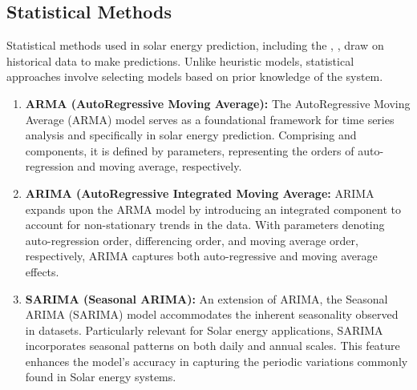 \documentclass[12pt]{uomthesis}
\begin{document}
\subsection{Statistical Methods}
Statistical methods used in solar energy prediction, including the , ,  draw on historical data to make predictions. Unlike heuristic models, statistical approaches involve selecting models based on prior knowledge of the system.

\begin{enumerate}
    \item \textbf{ARMA (AutoRegressive Moving Average):} The AutoRegressive Moving Average (ARMA) model \cite{singh2019guide,colak2015multi} serves as a foundational framework for time series analysis and specifically in solar energy prediction. Comprising  and  components, it is defined by parameters, representing the orders of auto-regression and moving average, respectively.
    \item \textbf{ARIMA (AutoRegressive Integrated Moving Average:} ARIMA \cite{atique2019forecasting,colak2015multi} expands upon the ARMA model by introducing an integrated component to account for non-stationary trends in the data. With parameters denoting auto-regression order, differencing order, and moving average order, respectively, ARIMA captures both auto-regressive and moving average effects.
    \item \textbf{SARIMA (Seasonal ARIMA):} An extension of ARIMA, the Seasonal ARIMA (SARIMA) \cite{haddad2019wind} model accommodates the inherent seasonality observed in datasets. Particularly relevant for Solar energy applications, SARIMA incorporates seasonal patterns on both daily and annual scales. This feature enhances the model's accuracy in capturing the periodic variations commonly found in Solar energy systems.
\end{enumerate}
\end{document}
